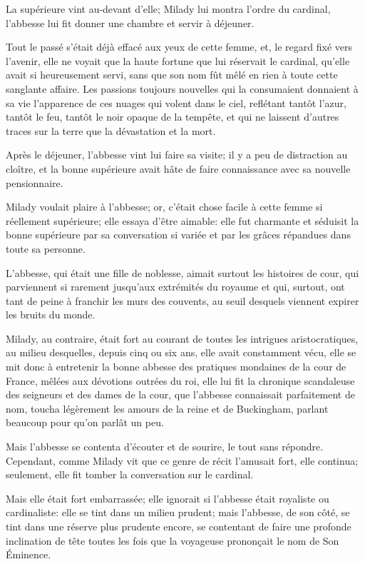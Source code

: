 La supérieure vint au-devant d'elle; Milady lui montra l'ordre du cardinal, l'abbesse lui fit donner une chambre et servir à déjeuner. 

Tout le passé s'était déjà effacé aux yeux de cette femme, et, le regard fixé vers l'avenir, elle ne voyait que la haute fortune que lui réservait le cardinal, qu'elle avait si heureusement servi, sans que son nom fût mêlé en rien à toute cette sanglante affaire. Les passions toujours nouvelles qui la consumaient donnaient à sa vie l'apparence de ces nuages qui volent dans le ciel, reflétant tantôt l'azur, tantôt le feu, tantôt le noir opaque de la tempête, et qui ne laissent d'autres traces sur la terre que la dévastation et la mort. 

Après le déjeuner, l'abbesse vint lui faire sa visite; il y a peu de distraction au cloître, et la bonne supérieure avait hâte de faire connaissance avec sa nouvelle pensionnaire. 

Milady voulait plaire à l'abbesse; or, c'était chose facile à cette femme si réellement supérieure; elle essaya d'être aimable: elle fut charmante et séduisit la bonne supérieure par sa conversation si variée et par les grâces répandues dans toute sa personne. 

L'abbesse, qui était une fille de noblesse, aimait surtout les histoires de cour, qui parviennent si rarement jusqu'aux extrémités du royaume et qui, surtout, ont tant de peine à franchir les murs des couvents, au seuil desquels viennent expirer les bruits du monde. 

Milady, au contraire, était fort au courant de toutes les intrigues aristocratiques, au milieu desquelles, depuis cinq ou six ans, elle avait constamment vécu, elle se mit donc à entretenir la bonne abbesse des pratiques mondaines de la cour de France, mêlées aux dévotions outrées du roi, elle lui fit la chronique scandaleuse des seigneurs et des dames de la cour, que l'abbesse connaissait parfaitement de nom, toucha légèrement les amours de la reine et de Buckingham, parlant beaucoup pour qu'on parlât un peu. 

Mais l'abbesse se contenta d'écouter et de sourire, le tout sans répondre. Cependant, comme Milady vit que ce genre de récit l'amusait fort, elle continua; seulement, elle fit tomber la conversation sur le cardinal. 

Mais elle était fort embarrassée; elle ignorait si l'abbesse était royaliste ou cardinaliste: elle se tint dans un milieu prudent; mais l'abbesse, de son côté, se tint dans une réserve plus prudente encore, se contentant de faire une profonde inclination de tête toutes les fois que la voyageuse prononçait le nom de Son Éminence. 

